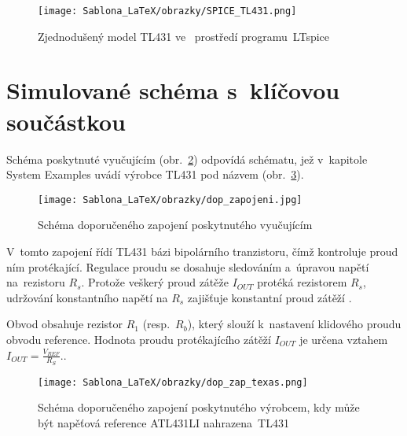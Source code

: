 \documentclass[12pt]{CLASS/protokol}
\begin{document}
    \begin{figure}[h]
        \centering
        \texttt{[image: Sablona\_LaTeX/obrazky/SPICE\_TL431.png]}
        \caption{Zjednodušený model TL431 ve~ prostředí programu~LTspice~\cite{LTspice}}
        \label{fig:model_schem}
    \end{figure}
    
\clearpage
\newpage
\section{Simulované schéma s~klíčovou součástkou}\label{sec:zapojeni}
    Schéma poskytnuté vyučujícím (obr.~\ref{fig:dop_zap}) odpovídá schématu, jež v~kapitole System Examples uvádí výrobce TL431 pod názvem  \cite{TI_TL431_datasheet, TI_current_srcs} (obr.~\ref{fig:dop_zap_tex}).
    
    \begin{figure}[h]
        \centering
        \texttt{[image: Sablona\_LaTeX/obrazky/dop\_zapojeni.jpg]}
        \caption{Schéma doporučeného zapojení poskytnutého vyučujícím}
        \label{fig:dop_zap}
    \end{figure}

    \par
    V~tomto zapojení řídí TL431 bázi bipolárního tranzistoru, čímž kontroluje proud ním protékající. Regulace proudu se dosahuje sledováním a~úpravou napětí na~rezistoru $R_s$. Protože veškerý proud zátěže $I_{OUT}$ protéká rezistorem $R_s$, udržování konstantního napětí na $R_s$ zajišťuje konstantní proud zátěží \cite{TI_current_srcs}.
    \par
    Obvod obsahuje rezistor $R_1$ (resp.~$R_b$), který slouží k~nastavení klidového proudu obvodu reference.  Hodnota proudu protékajícího zátěží $I_{OUT}$ je určena vztahem $I_{OUT} = \frac{V_{REF}}{R_S}$.\cite{TI_current_srcs}.

    \begin{figure}[h]
        \centering
        \texttt{[image: Sablona\_LaTeX/obrazky/dop\_zap\_texas.png]}
        \caption{Schéma doporučeného zapojení poskytnutého výrobcem, kdy může být napěťová reference ATL431LI nahrazena~TL431 \cite{TI_TL431_datasheet, TI_current_srcs}}
        \label{fig:dop_zap_tex}
    \end{figure}
    

    
\clearpage
\newpage
\end{document}

